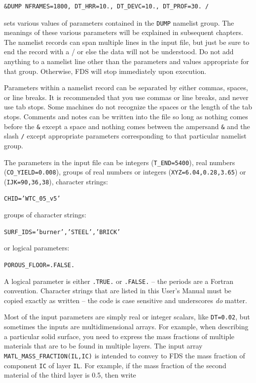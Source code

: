 \documentclass[11pt]{book}
\newcommand{\ct}{\tt\small}
\begin{document}
\footnotesize
\begin{verbatim}
&DUMP NFRAMES=1800, DT_HRR=10., DT_DEVC=10., DT_PROF=30. /
\end{verbatim}

\normalsize \noindent
sets various values of parameters contained in the {\ct DUMP} namelist group. The meanings of these various parameters will
be explained in subsequent chapters. The namelist records can span multiple lines in the input file, but just be sure to
end the record with a / or else the data will not be understood. Do not add anything to a namelist line other than the
parameters and values appropriate for that group. Otherwise, FDS will stop immediately upon execution.

Parameters within a namelist record can be separated by either commas, spaces, or line breaks. It is recommended that you use
commas or line breaks, and never use tab stops. Some machines do not recognize the spaces or the length of the tab stops.
Comments and notes can be written into the file so long as nothing comes
before the {\ct \&} except a space and nothing comes between the ampersand
{\ct \&} and the slash {\ct /} except appropriate parameters corresponding
to that particular namelist group.

The parameters in the input file can be integers ({\ct T\_END=5400}),
real numbers ({\ct CO\_YIELD=0.008}), groups of real numbers or integers
({\ct XYZ=6.04,0.28,3.65}) or ({\ct IJK=90,36,38}),
character strings:

{\ct CHID='WTC\_05\_v5'}

\noindent
groups of character strings:

{\ct SURF\_IDS='burner','STEEL','BRICK'}

\noindent
or logical parameters:

{\ct POROUS\_FLOOR=.FALSE.}

\noindent
A logical parameter is either
{\ct .TRUE.} or {\ct .FALSE.} -- the periods are a
Fortran convention. Character strings that are listed in
this User's Manual must be copied exactly as written -- the code
is case sensitive and underscores {\em do} matter.

Most of the input parameters are simply real or integer scalars, like {\ct DT=0.02}, but sometimes the inputs are
multidimensional arrays. For example, when describing a particular solid surface, you need to express the mass
fractions of multiple materials that are to be found in multiple layers. The input array {\ct MATL\_MASS\_FRACTION(IL,IC)} is
intended to convey to FDS the mass fraction of component {\ct IC} of layer {\ct IL}. For example, if the mass fraction of the
second material of the third layer is 0.5, then write
\end{document}
